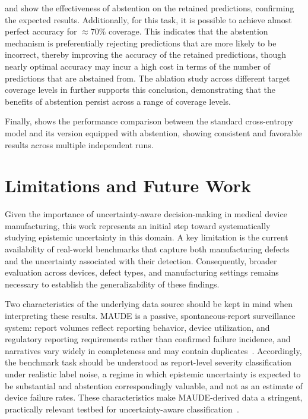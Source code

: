 

 and  show the effectiveness of abstention on the retained predictions, confirming the expected results. Additionally, for this task, it is possible to achieve almost perfect accuracy for \(\approx 70\%\) coverage.
This indicates that the abstention mechanism is preferentially rejecting predictions that are more likely to be incorrect, thereby improving the accuracy of the retained predictions, though nearly optimal accuracy may incur a high cost in terms of the number of predictions that are abstained from. The ablation study across different target coverage levels in  further supports this conclusion, demonstrating that the benefits of abstention persist across a range of coverage levels.

Finally,  shows the performance comparison between the standard cross-entropy model and its version equipped with abstention, showing consistent and favorable results across multiple independent runs.

\section{Limitations and Future Work}
\label{subsec:limitations-and-future-work}

Given the importance of uncertainty-aware decision-making in medical device manufacturing, this work represents an initial step toward systematically studying epistemic uncertainty in this domain. A key limitation is the current availability of real-world benchmarks that capture both manufacturing defects and the uncertainty associated with their detection. Consequently, broader evaluation across devices, defect types, and manufacturing settings remains necessary to establish the generalizability of these findings.

Two characteristics of the underlying data source should be kept in mind when interpreting these results. MAUDE is a passive, spontaneous-report surveillance system: report volumes reflect reporting behavior, device utilization, and regulatory reporting requirements rather than confirmed failure incidence, and narratives vary widely in completeness and may
contain duplicates~\cite{chung2020signal}. Accordingly, the benchmark task should be understood as report-level severity classification under realistic label noise, a regime in which epistemic uncertainty is expected to be substantial and abstention correspondingly valuable, and
not as an estimate of device failure rates. These characteristics make MAUDE-derived data a stringent, practically relevant testbed for uncertainty-aware classification~\cite{mao2021nlp,sohoni2026llm}.

